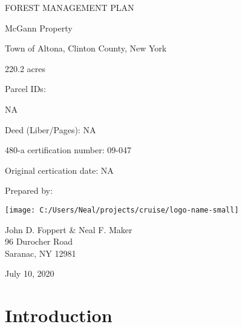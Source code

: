 \documentclass[]{tufte-handout}
\date{}
\begin{document}
 \vspace*{30pt}

\huge FOREST MANAGEMENT PLAN

\vspace{30pt}

\LARGE McGann Property

\vspace{22pt}

\normalsize Town of Altona, Clinton County, New York

\vspace{70pt}

\small 220.2 acres

\vspace{18pt}

Parcel IDs:

\vspace{8pt}

NA

\vspace{10pt}

Deed (Liber/Pages): NA

\vspace{10pt}

480-a certification number: 09-047

\vspace{10pt}

Original certication date: NA

\vspace{60pt}

Prepared by:

\texttt{[image: C:/Users/Neal/projects/cruise/logo-name-small]}

John D. Foppert \& Neal F. Maker\\
96 Durocher Road\\
Saranac, NY 12981

\vspace{30pt}

\large July 10, 2020

\pagebreak
{}

\section{Introduction}\label{introduction}
\end{document}
